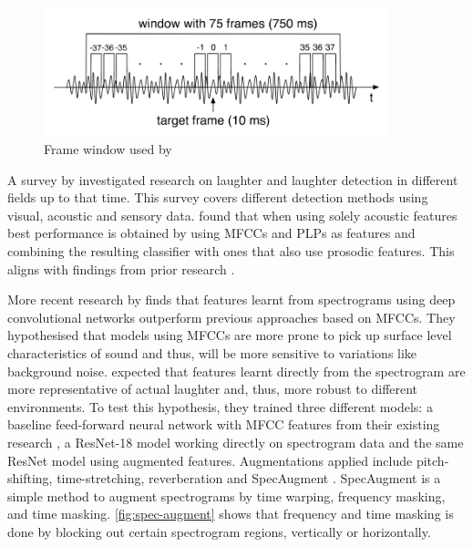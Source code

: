 \documentclass[bsc,frontabs,parskip,deptreport]{infthesis}
\begin{document}
\begin{figure}[htp]
    \centering
    \includegraphics[width=10cm]{imgs/Knox_window.png}
    \caption{Frame window used by \citet{knox2006automatic}}
    \label{fig:knox_window}
\end{figure}

A survey by \citet{cosentino2016quantitative} investigated research on laughter and laughter detection in different fields up to that time.
This survey covers different detection methods using visual, acoustic and sensory data.
\citet{cosentino2016quantitative} found that when using solely acoustic features best performance is obtained by using MFCCs and PLPs as features and combining the resulting classifier with ones that also use prosodic features.
This aligns with findings from prior research \citep{truong2007automatic, knox2006automatic}.

More recent research by \citet{gillick2021robust} finds that features learnt from spectrograms using deep convolutional networks outperform previous approaches based on MFCCs. 
They hypothesised that models using MFCCs are more prone to pick up surface level characteristics of sound and thus, will be more sensitive to variations like background noise.
\citet{gillick2021robust} expected that features learnt directly from the spectrogram are more representative of actual laughter and, thus, more robust to different environments. 
To test this hypothesis, they trained three different models: a baseline feed-forward neural network with MFCC features from their existing research \citep{ryokai2018capturing}, a ResNet-18 \citep{he2016deep} model working directly on spectrogram data and the same ResNet model using augmented features. Augmentations applied include pitch-shifting, time-stretching, reverberation and SpecAugment \citep{park2019specaugment}. SpecAugment is a simple method to augment spectrograms by time warping, frequency masking, and time masking. \autoref{fig:spec-augment} shows that frequency and time masking is done by blocking out certain spectrogram regions, vertically or horizontally. 
\end{document}
